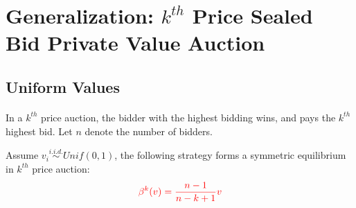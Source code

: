\documentclass{article}
\begin{document}
	\section{Generalization: $k^{th}$ Price Sealed Bid Private Value Auction}
	\subsection{Uniform Values}
	\paragraph{} In a $k^{th}$ price auction, the bidder with the highest bidding wins, and pays the $k^{th}$ highest bid. Let $n$ denote the number of bidders.
	\begin{proposition}
		Assume $v_i \overset{i.i.d.}{\sim} Unif(0, 1)$, the following strategy forms a symmetric equilibrium in $k^{th}$ price auction:
		\begin{align}
			\textcolor{red}{\beta^{k}(v) = \frac{n-1}{n-k+1}v}
		\end{align}
	\end{proposition}
	
\end{document}
